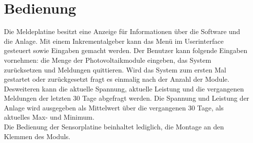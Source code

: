 %
%
%
\section{Bedienung}
Die Meldeplatine besitzt eine Anzeige für Informationen über die Software und die Anlage. Mit einem Inkrementalgeber kann das Menü im Userinterface gesteuert sowie Eingaben gemacht werden. Der Benutzer kann folgende Eingaben vornehmen: die Menge der Photovoltaikmodule eingeben, das System zurücksetzen und Meldungen quittieren. Wird das System zum ersten Mal gestartet oder zurückgesetzt fragt es einmalig nach der Anzahl der Module.\\
Desweiteren kann die aktuelle Spannung, aktuelle Leistung und die vergangenen Meldungen der letzten 30 Tage abgefragt werden. Die Spannung und Leistung der Anlage wird ausgegeben als Mittelwert über die vergangenen 30 Tage, als aktuelles Max- und Minimum.\\
Die Bedienung der Sensorplatine beinhaltet lediglich, die Montage an den Klemmen des Moduls.
%